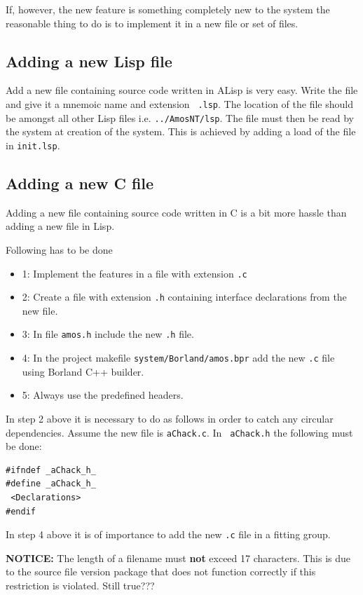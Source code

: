 If, however, the new feature is something completely new to the system the
reasonable thing to do is to implement it in a new file or set of files.
\subsection{Adding a new Lisp file}
Add a new file containing source code written in ALisp is very
easy. Write the file and give it a mnemoic name and extension {\tt
.lsp}. The location of the file should be amongst all other Lisp files
i.e. {\tt ../AmosNT/lsp}.  The file must then be read by the system at
creation of the system. This is achieved by adding a load of the file
in {\tt init.lsp}.

\subsection{Adding a new C file}
Adding a new file containing source code written in C is a bit more
hassle than adding a new file in Lisp.

Following has to be done
\begin{itemize}
\item 1: Implement the features in a file with extension {\tt .c} 
\item 2: Create a file with extension {\tt .h} containing interface declarations from the new file.
\item 3: In file {\tt amos.h} include the new {\tt .h} file.
\item 4: In the project makefile {\tt system/Borland/amos.bpr} add the new {\tt .c} file using Borland C++ builder.
\item 5: Always use the predefined headers.
\end{itemize}

In step 2 above it is necessary to do as follows in order to catch any
circular dependencies. Assume the new file is {\tt aChack.c}. In {\tt
aChack.h} the following must be done:
\begin{verbatim}
#ifndef _aChack_h_
#define _aChack_h_
 <Declarations>
#endif
\end{verbatim}

In step 4 above it is of importance to add the new {\tt .c} file in a 
fitting group. 

{\bf NOTICE:} The length of a filename must {\bf not} exceed 17 characters.
This is due to the source file version package that does not function
correctly if this restriction is violated. Still true???

